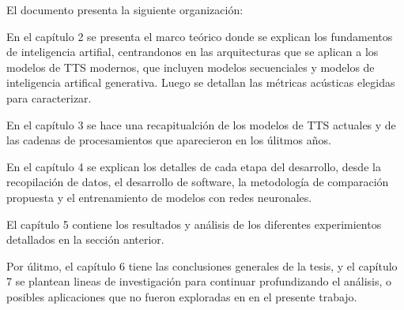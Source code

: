 El documento presenta la siguiente organización:

En el capítulo 2 se presenta el marco teórico donde se explican los fundamentos de inteligencia artifial, centrandonos en las arquitecturas que se aplican a los modelos de TTS modernos, que incluyen modelos secuenciales y modelos de inteligencia artifical generativa. Luego se detallan las métricas acústicas elegidas para caracterizar.

En el capítulo 3 se hace una recapitualción de los modelos de TTS actuales y de las cadenas de procesamientos que aparecieron en los úlitmos años.

En el capítulo 4 se explican los detalles de cada etapa del desarrollo, desde la recopilación de datos, el desarrollo de software, la metodología de comparación propuesta y el entrenamiento de modelos con redes neuronales.  

El capítulo 5 contiene los resultados y análisis de los diferentes experimientos detallados en la sección anterior. 

Por úlitmo, el capítulo 6 tiene las conclusiones generales de la tesis, y el capítulo 7 se plantean lineas de investigación para continuar profundizando el análisis, o posibles aplicaciones que no fueron exploradas en en el presente trabajo.
